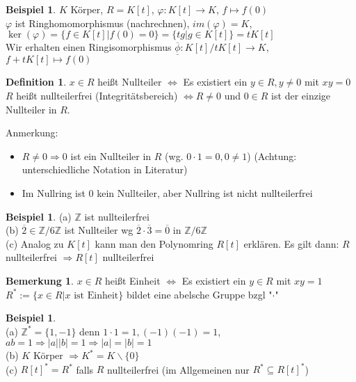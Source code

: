 \documentclass[10pt,a4paper,numbers=endperiod]{scrartcl}
\theoremstyle{definition}
\newtheorem{defi}[satz]{Definition}
\newtheorem{bem}[satz]{Bemerkung}
\newtheorem{bsp}[satz]{Beispiel}
\def\ZZ{{\mathbb Z}}
\begin{document}
\begin{bsp}
	$K$ Körper, $R = K[t]$, $\varphi: K[t] \rightarrow K$, $f \mapsto f(0)$\\
	$\varphi$ ist Ringhomomorphismus (nachrechnen), $im(\varphi) = K$, $\ker(\varphi) = \{f \in K[t]| f(0) = 0\} = \{tg| g \in K[t]\} = t K[t]$\\
	Wir erhalten einen Ringisomorphismus $\overline{\underline{\phi}}: K[t]/tK[t] \rightarrow K$, $f + tK[t] \mapsto f(0)$
\end{bsp}

\begin{defi}
	$x \in R$ heißt Nullteiler $\Leftrightarrow$ Es existiert ein $y \in R, y \neq 0$ mit $xy = 0$\\
	$R$ heißt nullteilerfrei (Integritätsbereich) $\Leftrightarrow R \neq0$ und $0 \in R$ ist der einzige Nullteiler in $R$.
\end{defi}

Anmerkung:
\begin{itemize}
	\item $R \neq 0 \Rightarrow 0$ ist ein Nullteiler in $R$ (wg. $0 \cdot1 = 0, 0 \neq 1$) (Achtung: unterschiedliche Notation in Literatur)
	\item Im Nullring ist $0$ kein Nullteiler, aber Nullring ist nicht nullteilerfrei
\end{itemize} 

\begin{bsp}
	(a) $\ZZ$ ist nullteilerfrei\\
	(b) $\overline{2} \in \ZZ/6 \ZZ$ ist Nullteiler wg $\overline{2} \cdot \overline{3} = \overline{0}$ in $\ZZ/6 \ZZ$\\
	(c) Analog zu $K[t]$ kann man den Polynomring $R[t]$ erklären. Es gilt dann: $R$ nullteilerfrei $\Rightarrow R[t]$ nullteilerfrei 
\end{bsp}

\begin{bem}
	$x \in R$ heißt Einheit $\Leftrightarrow$ Es existiert ein $y \in R$ mit $xy = 1$\\
	$R^* := \{x \in R| x \text{ ist Einheit}\}$ bildet eine abelsche Gruppe bzgl "$\cdot$"
\end{bem}

\begin{bsp}
	$ $\\
	(a) $\ZZ^* = \{1, -1\}$ denn $1 \cdot 1 = 1, (-1)(-1) = 1$, $ab = 1 \Rightarrow |a||b| = 1 \Rightarrow |a| = |b| = 1$\\
	(b) $K$ Körper $\Rightarrow K^* = K \backslash \{0\}$\\
	(c) $R[t]^* = R^*$ falls $R$ nullteilerfrei (im Allgemeinen nur $R^* \subseteq R[t]^*$) 
\end{bsp}
\end{document}
